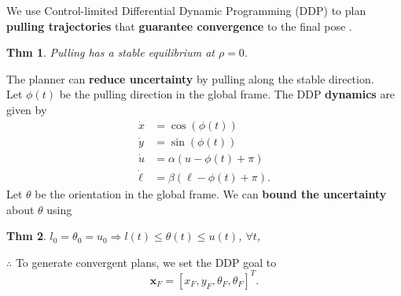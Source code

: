 \documentclass[potrait,paperwidth=20in,paperheight=30in,margin=1.5in,fontscale = 0.5]{baposter} %
\newtheorem{theorem}{Thm}
\begin{document}
\begin{poster}
{  We use Control-limited Differential Dynamic Programming (DDP) to
  plan \textbf{pulling trajectories} that \textbf{guarantee
    convergence} to the final pose \cite{tassa2014control}. 

  \begin{theorem} Pulling has a stable equilibrium at $\rho = 0$. \label{item:1}
  \end{theorem}

  The planner can \textbf{reduce uncertainty} by pulling along the stable direction.\\

  Let $\phi(t)$ be the pulling direction in the global frame. The
  DDP \textbf{dynamics} are given by
  \begin{align}
    \dot{x} &= \cos(\phi(t))\\
    \dot{y} &= \sin(\phi(t))\\
    \dot{u} &=  \alpha(u - \phi(t) + \pi) \label{eq:u-ode}\\ 
    \dot{\ell} &=  \beta(\ell - \phi(t) + \pi).
  \end{align}
  Let $\theta$ be the orientation in the global frame. We can
  \textbf{bound the uncertainty} about $\theta$ using
  \begin{theorem} $l_0 = \theta_0 = u_0 \Rightarrow l(t) \leq \theta(t) \leq u(t)$, $\forall t$,
  \end{theorem}
  $\therefore$ To generate convergent plans, we set the DDP goal to
  \begin{equation}
    \mathbf{x}_F = [x_F, y_F, \theta_F, \theta_F]^T.
  \end{equation}
}


\end{poster}
\end{document}

